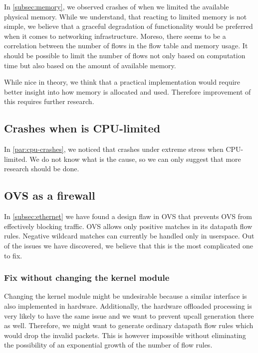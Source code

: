 In \cref{subsec:memory}, we observed crashes of  when we limited the available physical memory. While we understand, that reacting to limited memory is not simple, we believe that a graceful degradation of functionality would be preferred when it comes to networking infrastructure. Moreso, there seems to be a correlation between the number of flows in the flow table and memory usage. It should be possible to limit the number of flows not only based on computation time but also based on the amount of available memory.

While nice in theory, we think that a practical implementation would require better insight into how memory is allocated and used. Therefore improvement of this requires further research.


\subsection{Crashes when  is CPU-limited}

In \cref{par:cpu-crashes}, we noticed that  crashes under extreme stress when CPU-limited. We do not know what is the cause, so we can only suggest that more research should be done.

\subsection{OVS as a firewall}

In \cref{subsec:ethernet} we have found a design flaw in OVS that prevents OVS from effectively blocking traffic. OVS allows only positive matches in its datapath flow rules. Negative wildcard matches can currently be handled only in userspace. Out of the issues we have discovered, we believe that this is the most complicated one to fix. 

\subsubsection{Fix without changing the kernel module}
Changing the kernel module might be undesirable because a similar interface is also implemented in hardware. Additionally, the hardware offloaded processing is very likely to have the same issue and we want to prevent upcall generation there as well. Therefore, we might want to generate ordinary datapath flow rules which would drop the invalid packets. This is however impossible without eliminating the possibility of an exponential growth of the number of flow rules.

